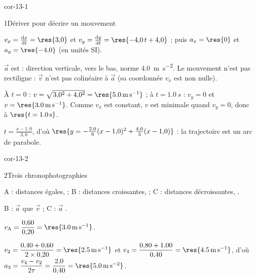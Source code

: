 \corrigesSouples

\begin{blocLivre}{cor-13-1}
\begin{corrige}{1}{Dériver pour décrire un mouvement}
\begin{questions}
\item $v_x=\ddt{x}=\res{3{,}0}$ et $v_y=\ddt{y}=\res{-4{,}0\,t+4{,}0}$ ; puis $a_x=\res{0}$ et $a_y=\res{-4{,}0}$ (en unités SI).
\item $\vec{a}$ est  : direction verticale, vers le bas, norme \qty{4,0}{m.s^{-2}}. Le mouvement n'est
pas rectiligne : $\vec{v}$ n'est pas colinéaire à $\vec{a}$ (sa coordonnée $v_x$ est non nulle).
\item À $t=0$ : $v=\sqrt{3{,}0^2+4{,}0^2}=\res{\qty{5,0}{m.s^{-1}}}$ ; à $t=\qty{1,0}{s}$ : $v_y=0$ et
$v=\res{\qty{3,0}{m.s^{-1}}}$. Comme $v_x$ est constant, $v$ est minimale quand $v_y=0$, donc à
$\res{t=\qty{1,0}{s}}$.
\item $t=\frac{x-1{,}0}{3{,}0}$, d'où $\res{y=-\frac{2{,}0}{9}(x-1{,}0)^2+\frac{4{,}0}{3}(x-1{,}0)}$ : la trajectoire est un
arc de parabole.
\end{questions}
\end{corrige}
\end{blocLivre}
\begin{blocLivre}{cor-13-2}
\begin{corrige}{2}{Trois chronophotographies}
\begin{questions}
\item A : distances égales,  ; B : distances croissantes,  ; C : distances décroissantes, .
\item B : $\vec{a}$  que $\vec{v}$ ; C : $\vec{a}$ .
\item $v_\mathrm{A}=\dfrac{0{,}60}{0{,}20}=\res{\qty{3,0}{m.s^{-1}}}$.
\item $v_2=\dfrac{0{,}40+0{,}60}{2\times0{,}20}=\res{\qty{2,5}{m.s^{-1}}}$ et
$v_4=\dfrac{0{,}80+1{,}00}{0{,}40}=\res{\qty{4,5}{m.s^{-1}}}$, d'où
$a_3=\dfrac{v_4-v_2}{2\tau}=\dfrac{2{,}0}{0{,}40}=\res{\qty{5,0}{m.s^{-2}}}$.
\end{questions}
\end{corrige}
\end{blocLivre}
